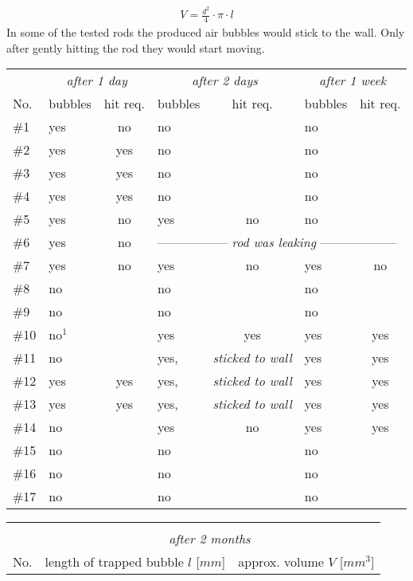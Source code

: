 \begin{align}
 V = \frac{d^2}{4}\cdot \pi \cdot l
\end{align}
In some of the tested rods the produced air bubbles would stick to the wall. Only after gently hitting the rod they would start moving.


\begin{table}[]
\centering
\begin{tabular}{l|lc|lc|lc}
    & \multicolumn{2}{c}{\textit{after 1 day}} 	& \multicolumn{2}{c}{\textit{after 2 days}}	& \multicolumn{2}{c}{\textit{after 1 week}}	\\ 
No. & bubbles	& hit req.	& bubbles 	& hit req.	& bubbles 	& hit req.	\\
\toprule
\#1   & yes	& no		& no		&		& no		&		\\
\#2   & yes	& yes		& no		&		& no		&		\\
\#3   & yes	& yes		& no		&		& no		&		\\
\#4   & yes	& yes		& no		&		& no		&		\\
\#5   & yes	& no		& yes		& no		& no		&		\\
\#6   & yes	& no		& \multicolumn{4}{l}{-----------------\textit{ rod was leaking }------------------}	\\
\#7   & yes	& no		& yes		& no		& yes		& no		\\
\#8   & no	&		& no		&		& no		&		\\
\#9   & no	&		& no		&		& no		&		\\
\#10  & no$^1$	&		& yes		& yes		& yes		& yes		\\
\#11  & no	&		& yes,		& \textit{sticked to wall} &	 yes	& yes\\
\#12  & yes	& yes		& yes,		& \textit{sticked to wall} &	 yes	& yes\\
\#13  & yes	& yes		& yes,		& \textit{sticked to wall} &	 yes	& yes\\
\#14  & no	&   		& yes		& no		& yes		& yes		\\
\#15  & no	&   		& no		&		& no		&		\\
\#16  & no	&   		& no		&		& no		&		\\
\#17  & no	&   		& no		&		& no		&		\\
\bottomrule
\end{tabular}
\begin{tabular}{l|lr}
\multicolumn{3}{c}{}								\\
& \multicolumn{2}{c}{\textit{after 2 months}}					\\ 
No. & length of trapped bubble $l$ [$mm$] 	& approx. volume $V$ [$mm^3$]	\\

\end{tabular}
\end{table}
